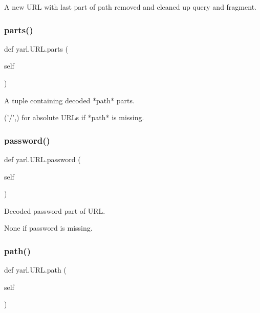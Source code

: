 \begin{DoxyVerb}A new URL with last part of path removed and cleaned up query and
fragment.\end{DoxyVerb}
 \mbox{\label{classyarl_1_1_u_r_l_a5c6a75641c71c3a4bf0b55c678ac65ef}} 
\subsubsection{\texorpdfstring{parts()}{parts()}}
{\footnotesize\ttfamily def yarl.\+U\+R\+L.\+parts (\begin{DoxyParamCaption}\item[{}]{self }\end{DoxyParamCaption})}

\begin{DoxyVerb}A tuple containing decoded *path* parts.

('/',) for absolute URLs if *path* is missing.\end{DoxyVerb}
 \mbox{\label{classyarl_1_1_u_r_l_a634441286d0daca5528ba5f48373ac21}} 
\subsubsection{\texorpdfstring{password()}{password()}}
{\footnotesize\ttfamily def yarl.\+U\+R\+L.\+password (\begin{DoxyParamCaption}\item[{}]{self }\end{DoxyParamCaption})}

\begin{DoxyVerb}Decoded password part of URL.

None if password is missing.\end{DoxyVerb}
 \mbox{\label{classyarl_1_1_u_r_l_ad0f8dd2dcbe14c8e29084f73148b584e}} 
\subsubsection{\texorpdfstring{path()}{path()}}
{\footnotesize\ttfamily def yarl.\+U\+R\+L.\+path (\begin{DoxyParamCaption}\item[{}]{self }\end{DoxyParamCaption})}

